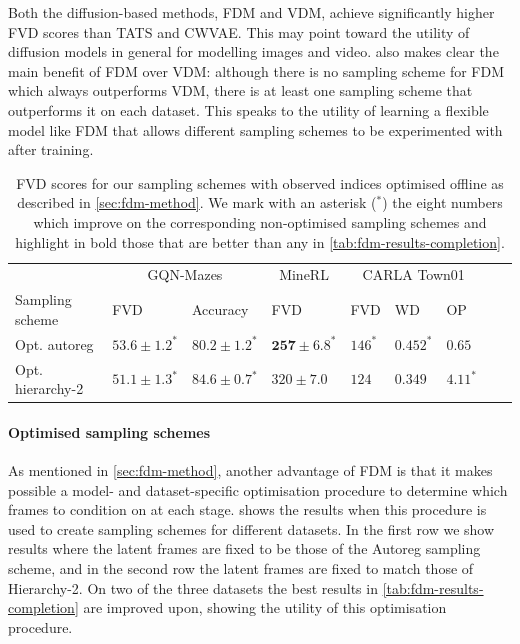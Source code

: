 Both the diffusion-based methods, FDM and VDM, achieve significantly higher FVD scores than TATS and CWVAE. This may point toward the utility of diffusion models in general for modelling images and video.  also makes clear the main benefit of FDM over VDM: although there is no sampling scheme for FDM which always outperforms VDM, there is at least one sampling scheme that outperforms it on each dataset. This speaks to the utility of learning a flexible model like FDM that allows different sampling schemes to be experimented with after training.

\begin{table} %
  \small
  \caption{FVD scores for our sampling schemes with observed indices optimised offline as described in \cref{sec:fdm-method}.  We mark with an asterisk ($^*$) the eight numbers which improve on the corresponding non-optimised sampling schemes and highlight in bold those that are better than any in \cref{tab:fdm-results-completion}.}
  \vspace{2mm}
  \label{tab:fdm-optimized}
  \centering
  \begin{tabular}{lllllllll}
    \toprule
     & \multicolumn{2}{c}{GQN-Mazes}  & \multicolumn{1}{c}{MineRL}  & \multicolumn{3}{c}{CARLA Town01} \\
    \cmidrule(r){2-3} \cmidrule(r){4-4} \cmidrule(r){5-7}
    Sampling scheme       & FVD     & Accuracy    &    FVD & FVD & WD & OP \\
    \midrule
    Opt. autoreg        & $53.6 \pm 1.2^*$            & $80.2 \pm 1.2^*$            & $\mathbf{257 \pm 6.8}^*$    &   $146^*$ & $0.452^*$ & $0.65$   \\
    Opt. hierarchy-2   & $\mathbf{51.1 \pm 1.3}^*$    & $\mathbf{84.6 \pm 0.7}^*$   & $320 \pm 7.0$    &   $124$ & $0.349$ & $4.11^*$   \\
    \bottomrule
  \end{tabular}
\end{table}

\paragraph{Optimised sampling schemes}
As mentioned in \cref{sec:fdm-method}, another advantage of FDM is that it makes possible a model- and dataset-specific optimisation procedure to determine which frames to condition on at each stage.  shows the results when this procedure is used to create sampling schemes for different datasets. In the first row we show results where the latent frames are fixed to be those of the Autoreg sampling scheme, and in the second row the latent frames are fixed to match those of Hierarchy-2. On two of the three datasets the best results in \cref{tab:fdm-results-completion} are improved upon, showing the utility of this optimisation procedure.

